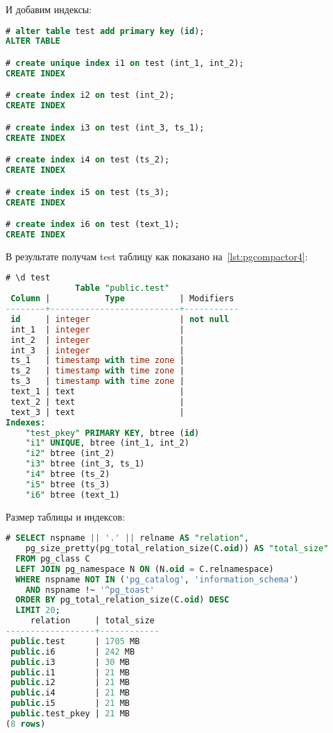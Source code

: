 И добавим индексы:

\begin{lstlisting}[language=SQL,label=lst:pgcompactor3,caption=Индексы для test]
# alter table test add primary key (id);
ALTER TABLE

# create unique index i1 on test (int_1, int_2);
CREATE INDEX

# create index i2 on test (int_2);
CREATE INDEX

# create index i3 on test (int_3, ts_1);
CREATE INDEX

# create index i4 on test (ts_2);
CREATE INDEX

# create index i5 on test (ts_3);
CREATE INDEX

# create index i6 on test (text_1);
CREATE INDEX
\end{lstlisting}

В результате получам test таблицу как показано на~\ref{lst:pgcompactor4}:

\begin{lstlisting}[language=SQL,label=lst:pgcompactor4,caption=Таблица test]
# \d test
              Table "public.test"
 Column |           Type           | Modifiers
--------+--------------------------+-----------
 id     | integer                  | not null
 int_1  | integer                  |
 int_2  | integer                  |
 int_3  | integer                  |
 ts_1   | timestamp with time zone |
 ts_2   | timestamp with time zone |
 ts_3   | timestamp with time zone |
 text_1 | text                     |
 text_2 | text                     |
 text_3 | text                     |
Indexes:
    "test_pkey" PRIMARY KEY, btree (id)
    "i1" UNIQUE, btree (int_1, int_2)
    "i2" btree (int_2)
    "i3" btree (int_3, ts_1)
    "i4" btree (ts_2)
    "i5" btree (ts_3)
    "i6" btree (text_1)

\end{lstlisting}

Размер таблицы и индексов:

\begin{lstlisting}[language=SQL,label=lst:pgcompactor5,caption=Размер таблицы и индексов]
# SELECT nspname || '.' || relname AS "relation",
    pg_size_pretty(pg_total_relation_size(C.oid)) AS "total_size"
  FROM pg_class C
  LEFT JOIN pg_namespace N ON (N.oid = C.relnamespace)
  WHERE nspname NOT IN ('pg_catalog', 'information_schema')
    AND nspname !~ '^pg_toast'
  ORDER BY pg_total_relation_size(C.oid) DESC
  LIMIT 20;
     relation     | total_size
------------------+------------
 public.test      | 1705 MB
 public.i6        | 242 MB
 public.i3        | 30 MB
 public.i1        | 21 MB
 public.i2        | 21 MB
 public.i4        | 21 MB
 public.i5        | 21 MB
 public.test_pkey | 21 MB
(8 rows)
\end{lstlisting}

